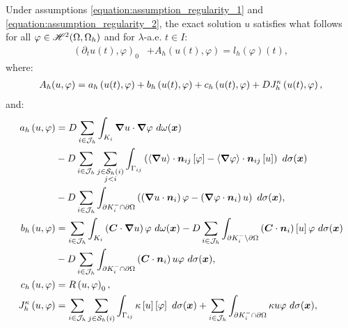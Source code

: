 Under assumptions \eqref{equation:assumption_regularity_1} and \eqref{equation:assumption_regularity_2}, the exact solution $u$ satisfies what follows for all $\varphi \in \mathscr{H}^{2}(\Omega, \Omega_h)$ and for $\lambda$-a.e. $t \in I$:
\begin{align}
    \left( \partial_t u(t), \varphi \right)_0 &+ A_h(u(t), \varphi) = l_h \left( \varphi \right) (t),
\end{align}
where:
\begin{gather}
    A_h(u, \varphi) = a_h \left( u(t), \varphi \right) + b_h \left( u(t), \varphi \right) + c_h \left( u(t), \varphi \right) + D J^{\kappa}_h \left( u(t), \varphi \right) \label{equation:cdr_Ah},
\end{gather}
and:
\begin{align}
    a_h \left( u, \varphi \right) &= \Diffusion \sum_{i \in \SpaceIndices} \int_{K_i} \Gradient u \cdot \Gradient \varphi ~ d \omega(\Vector{x}) \label{equation:cdr_ah} \\
    &- \Diffusion \sum_{i \in \SpaceIndices} \sum_{\substack{j \in \Neighbours{i} \\ j < i}} \int_{\Gamma_{ij}} \left( \left\langle \Gradient u \right\rangle \cdot \Vector{n}_{ij} \left[ \varphi \right] - \left\langle \Gradient \varphi \right\rangle \cdot \Vector{n}_{ij} \left[ u \right] \right) ~ d \sigma(\Vector{x}) \notag \\
    &- \Diffusion \sum_{i \in \SpaceIndices} \int_{\partial K_i^- \cap \partial \Omega} \left( \left( \Gradient u \cdot \Vector{n}_i \right) \varphi - \left( \Gradient \varphi \cdot \Vector{n}_i \right) u \right) ~ d \sigma(\Vector{x}), \notag \\
    b_h \left( u, \varphi \right) &= \sum_{i \in \SpaceIndices} \int_{K_i} \left( \Convection \cdot \Gradient u \right) \varphi ~ d \omega(\Vector{x}) \label{equation:cdr_bh} - \Diffusion \sum_{i \in \SpaceIndices} \int_{\partial K_i^- \setminus \partial \Omega} \left( \Convection \cdot \Vector{n}_i \right) \left[ u \right] \varphi ~ d \sigma(\Vector{x}) \\
    &- \Diffusion \sum_{i \in \SpaceIndices} \int_{\partial K_i^- \cap \partial \Omega} \left( \Convection \cdot \Vector{n}_i \right) u \varphi ~ d \sigma(\Vector{x}), \notag \\
    c_h \left( u, \varphi \right) &= \Reaction \left( u, \varphi \right)_0, \label{equation:cdr_ch} \\
    J^{\kappa}_h \left( u, \varphi \right) &= \sum_{i \in \SpaceIndices} \sum_{j \in \Neighbours{i}} \int_{\Gamma_{ij}} \kappa \left[ u \right] \left[ \varphi \right] ~ d \sigma(\Vector{x}) + \sum_{i \in \SpaceIndices} \int_{\partial K_i^- \cap \partial \Omega} \kappa u \varphi ~ d \sigma(\Vector{x}), \label{equation:cdr_jh} \\

\end{align}
